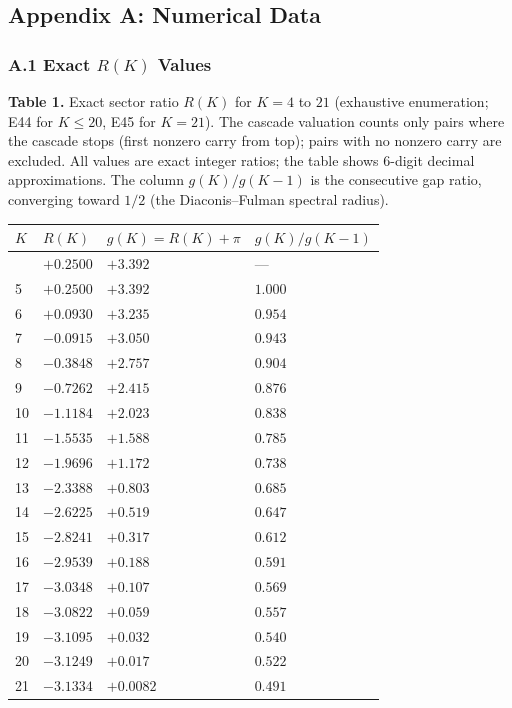 \documentclass[
  11pt,
]{article}
\begin{document}
\newpage

\subsection{Appendix A: Numerical Data}\label{appendix-a-numerical-data}

\subsubsection{\texorpdfstring{A.1 Exact \(R(K)\)
Values}{A.1 Exact R(K) Values}}\label{a.1-exact-rk-values}

\textbf{Table 1.} Exact sector ratio \(R(K)\) for \(K = 4\) to \(21\)
(exhaustive enumeration; E44 for \(K \leq 20\), E45 for \(K = 21\)). The cascade
valuation counts only pairs where the cascade stops (first nonzero carry from
top); pairs with no nonzero carry are excluded. All values are exact integer
ratios; the table shows 6-digit decimal approximations. The column
\(g(K)/g(K-1)\) is the consecutive gap ratio, converging toward \(1/2\) (the
Diaconis--Fulman spectral radius).

\begin{longtable}[]{@{}llll@{}}
\toprule\noalign{}
\(K\) & \(R(K)\) & \(g(K) = R(K) + \pi\) & \(g(K)/g(K-1)\) \\
\midrule\noalign{}
\endhead
\bottomrule\noalign{}
\endlastfoot
4 & \(+0.2500\) & \(+3.392\) & --- \\
5 & \(+0.2500\) & \(+3.392\) & \(1.000\) \\
6 & \(+0.0930\) & \(+3.235\) & \(0.954\) \\
7 & \(-0.0915\) & \(+3.050\) & \(0.943\) \\
8 & \(-0.3848\) & \(+2.757\) & \(0.904\) \\
9 & \(-0.7262\) & \(+2.415\) & \(0.876\) \\
10 & \(-1.1184\) & \(+2.023\) & \(0.838\) \\
11 & \(-1.5535\) & \(+1.588\) & \(0.785\) \\
12 & \(-1.9696\) & \(+1.172\) & \(0.738\) \\
13 & \(-2.3388\) & \(+0.803\) & \(0.685\) \\
14 & \(-2.6225\) & \(+0.519\) & \(0.647\) \\
15 & \(-2.8241\) & \(+0.317\) & \(0.612\) \\
16 & \(-2.9539\) & \(+0.188\) & \(0.591\) \\
17 & \(-3.0348\) & \(+0.107\) & \(0.569\) \\
18 & \(-3.0822\) & \(+0.059\) & \(0.557\) \\
19 & \(-3.1095\) & \(+0.032\) & \(0.540\) \\
20 & \(-3.1249\) & \(+0.017\) & \(0.522\) \\
21 & \(-3.1334\) & \(+0.0082\) & \(0.491\) \\
\end{longtable}
\end{document}
